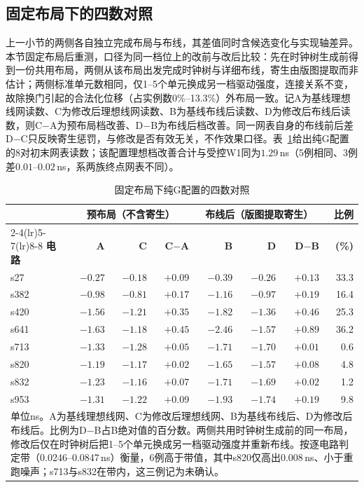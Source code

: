 \documentclass[twocolumn,10pt,fontset=windows]{ctexart}
\begin{document}
\subsection{固定布局下的四数对照}\label{sec:phys_four}

上一小节的两侧各自独立完成布局与布线，其差值同时含候选变化与实现轴差异。本节固定布局后重测，口径为同一档位上的改前与改后比较：先在时钟树生成前得到一份共用布局，两侧从该布局出发完成时钟树与详细布线，寄生由版图提取而非估计；两侧标准单元数相同，仅1--5个单元换成另一档驱动强度，连接关系不变，故除换门引起的合法化位移（占实例数0\%--13.3\%）外布局一致。记A为基线理想线网读数、C为修改后理想线网读数、B为基线布线后读数、D为修改后布线后读数，则C$-$A为预布局档改善、D$-$B为布线后档改善。同一网表自身的布线前后差D$-$C只反映寄生惩罚，与修改是否有效无关，不作效果口径。表~\ref{tab:phys_four}给出纯G配置的8对初末网表读数；该配置理想档改善合计与受控W1同为$1.29$\,ns（5例相同、3例差$0.01$--$0.02$\,ns，系两族终点网表不同）。

\begin{table}[htbp]
\centering\caption{固定布局下纯G配置的四数对照}\label{tab:phys_four}
\footnotesize\setlength{\tabcolsep}{3pt}
\begin{tabular}{lrrrrrrr}
\toprule
 & \multicolumn{3}{c}{\textbf{预布局（不含寄生）}} & \multicolumn{3}{c}{\textbf{布线后（版图提取寄生）}} & \textbf{比例}\\
\cmidrule(lr){2-4}\cmidrule(lr){5-7}\cmidrule(lr){8-8}
\textbf{电路} & \textbf{A} & \textbf{C} & \textbf{C$-$A} & \textbf{B} & \textbf{D} & \textbf{D$-$B} & \textbf{(\%)}\\
\midrule
s27 & $-0.27$ & $-0.18$ & $+0.09$ & $-0.39$ & $-0.26$ & $+0.13$ & 33.3\\
s382 & $-0.98$ & $-0.81$ & $+0.17$ & $-1.16$ & $-0.97$ & $+0.19$ & 16.4\\
s420 & $-1.56$ & $-1.21$ & $+0.35$ & $-1.82$ & $-1.36$ & $+0.46$ & 25.3\\
s641 & $-1.63$ & $-1.18$ & $+0.45$ & $-2.46$ & $-1.57$ & $+0.89$ & 36.2\\
s713 & $-1.33$ & $-1.28$ & $+0.05$ & $-1.71$ & $-1.70$ & $+0.01$ & 0.6\\
s820 & $-1.19$ & $-1.17$ & $+0.02$ & $-1.65$ & $-1.57$ & $+0.08$ & 4.8\\
s832 & $-1.23$ & $-1.16$ & $+0.07$ & $-1.71$ & $-1.69$ & $+0.02$ & 1.2\\
s953 & $-1.31$ & $-1.22$ & $+0.09$ & $-1.93$ & $-1.74$ & $+0.19$ & 9.8\\
\bottomrule
\multicolumn{8}{p{0.95\columnwidth}}{\footnotesize 单位ns。A为基线理想线网、C为修改后理想线网、B为基线布线后、D为修改后布线后。比例为D$-$B占B绝对值的百分数。两侧共用时钟树生成前的同一布局，修改后仅在时钟树后把1--5个单元换成另一档驱动强度并重新布线。按逐电路判定带（0.0246--0.0847\,ns）衡量，6例高于带值，其中s820仅高出0.008\,ns、小于重跑噪声；s713与s832在带内，这三例记为未确认。}\\
\end{tabular}
\end{table}
\end{document}
